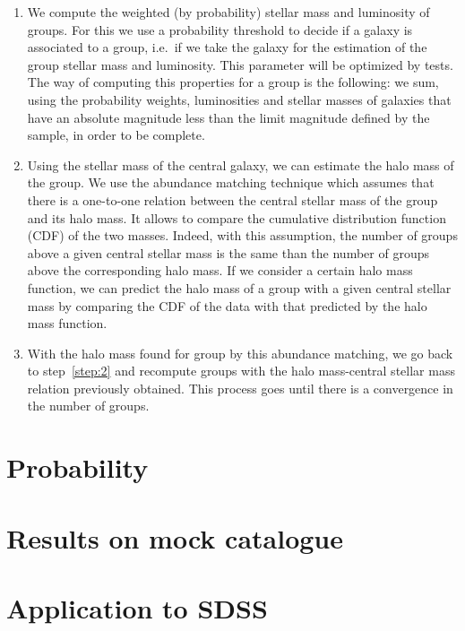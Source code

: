 \begin{enumerate}
    \item We compute the weighted (by probability) stellar mass and
        luminosity of groups. For this we use a probability threshold to
        decide if a galaxy is associated to a group, i.e.\ if we take the
        galaxy for the estimation of the group stellar mass and luminosity.
        This parameter will be optimized by tests. The way of computing this
        properties for a group is the following: we sum, using the
        probability weights, luminosities and stellar masses of galaxies
        that have an absolute magnitude less than the limit magnitude
        defined by the sample, in order to be complete.

    \item Using the stellar mass of the central galaxy, we can estimate the
        halo mass of the group. We use the abundance matching technique
        which assumes that there is a one-to-one relation between the
        central stellar mass of the group and its halo mass. It allows to
        compare the cumulative distribution function (CDF) of the two
        masses. Indeed, with this assumption, the number of groups above a
        given central stellar mass is the same than the number of groups
        above the corresponding halo mass. If we consider a certain halo
        mass function, we can predict the halo mass of a group with a given
        central stellar mass by comparing the CDF of the data with that
        predicted by the halo mass function.

    \item With the halo mass found for group by this abundance matching, we
        go back to step~\ref{step:2} and recompute groups with the halo
        mass-central stellar mass relation previously obtained. This process
        goes until there is a convergence in the number of groups.
\end{enumerate}

\section{Probability}
\label{sec:probability}

\section{Results on mock catalogue}
\label{sec:results_on_mock_catalogue}

\section{Application to SDSS}
\label{sec:application_to_sdss}



